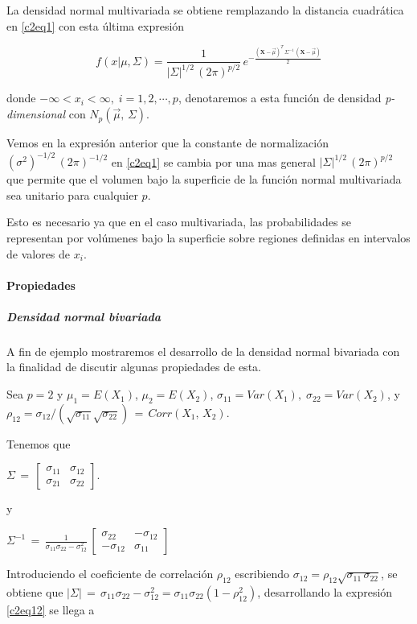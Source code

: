 \documentclass[spanish]{report}
\begin{document}
La densidad normal multivariada se obtiene remplazando la distancia cuadrática en \ref{c2eq1} con esta última expresión

\begin{equation}
f(x|\mu,\Sigma)=\frac{1}{|\Sigma|^{1/2}\,(2\pi)^{p/2}}\,e^{-\frac{(\textbf{X}-\vec{\mu})^T\,\Sigma^{-1}\,(\textbf{X}-\vec{\mu})}{2}}
\label{c2eq13}
\end{equation}

donde $-\infty <  x_i < \infty,\;i=1,2,\cdots,p$, denotaremos a esta función de densidad \emph{p-dimensional}  con $N_p(\vec{\mu},\,\Sigma)$.

Vemos en la expresión anterior que la constante de normalización $(\sigma^2)^{-1/2}\,(2\pi)^{-1/2}$ en \ref{c2eq1} se cambia por una mas general $|\Sigma|^{1/2}\,(2\pi)^{p/2}$ que permite que el volumen bajo la superficie de la función normal multivariada sea unitario para cualquier $p$.

Esto es necesario ya que en el caso multivariada, las probabilidades se representan por volúmenes bajo la superficie sobre regiones definidas en intervalos de valores de $x_i$.

\paragraph{Propiedades}
\subparagraph{Densidad normal bivariada}

A fin de ejemplo mostraremos el desarrollo de la densidad normal bivariada con la finalidad de discutir algunas propiedades de esta.

Sea $p=2$ y $\mu_1=E(X_1)$, $\mu_2=E(X_2)$, $\sigma_{11} = Var(X_1),\;\sigma_{22}=Var(X_2)$, y $\rho_{12} = \sigma_{12}/(\sqrt{\sigma_{11}}\sqrt{\sigma_{22}})\,=\,Corr(X_1,\,X_2)$.  

Tenemos que


$\Sigma\,=\,\begin{bmatrix}\sigma_{11}&\sigma_{12}\\\sigma_{21}&\sigma_{22}\end{bmatrix}$.


y 


$\Sigma^{-1}\,=\,\frac{1}{\sigma_{11}\sigma_{22}-\sigma^2_{12}}\,\begin{bmatrix}
\sigma_{22}&-\sigma_{12}\\
-\sigma_{12}&\sigma_{11}
\end{bmatrix}$


Introduciendo el coeficiente de correlación $\rho_{12}$ escribiendo $\sigma_{12}=\rho_{12}\sqrt{\sigma_{11}\,\sigma_{22}}$, se obtiene que $|\Sigma|\,=\,\sigma_{11}\sigma_{22}-\sigma^2_{12}=\sigma_{11}\sigma_{22}(1-\rho^2_{12})$, desarrollando la expresión \ref{c2eq12}  se llega a
\end{document}
